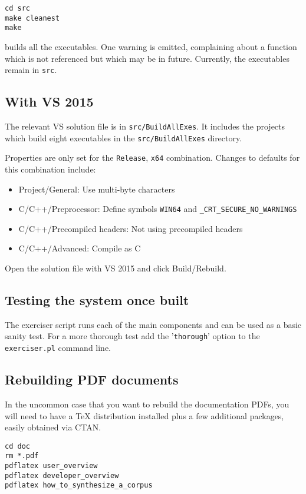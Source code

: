 \documentclass{article}
\begin{document}
\begin{verbatim}
cd src
make cleanest
make
\end{verbatim}

builds all the executables.  One warning is emitted, complaining about a function which is not
referenced but which may be in future.  Currently, the executables
remain in \texttt{src}.

\subsection{With VS 2015}
The relevant VS solution file is in
\texttt{src/BuildAllExes}. It includes the projects which
build eight executables in the \texttt{src/BuildAllExes}
directory.

Properties are only set for the \texttt{Release}, \texttt{x64}
combination.  Changes to defaults for this combination include:

\begin{itemize}
\item Project/General:  Use multi-byte characters
  \item C/C++/Preprocessor: Define symbols \texttt{WIN64} and
    \texttt{\_CRT\_SECURE\_NO\_WARNINGS}
  \item C/C++/Precompiled headers: Not using precompiled headers
  \item C/C++/Advanced:  Compile as C
\end{itemize}

Open the solution file with VS 2015 and click Build/Rebuild.

\subsection{Testing the system once built}
The exerciser script runs each of the main components and can be used
as a basic sanity test.  For a more thorough test add the '\texttt{thorough}'
option to the \texttt{exerciser.pl} command line.

\subsection{Rebuilding PDF documents}
In the uncommon case that you want to rebuild the documentation PDFs, you will need
to have a TeX distribution installed plus a few additional packages,
easily obtained via CTAN.

\begin{verbatim}
cd doc
rm *.pdf
pdflatex user_overview
pdflatex developer_overview
pdflatex how_to_synthesize_a_corpus
\end{verbatim}
\end{document}
